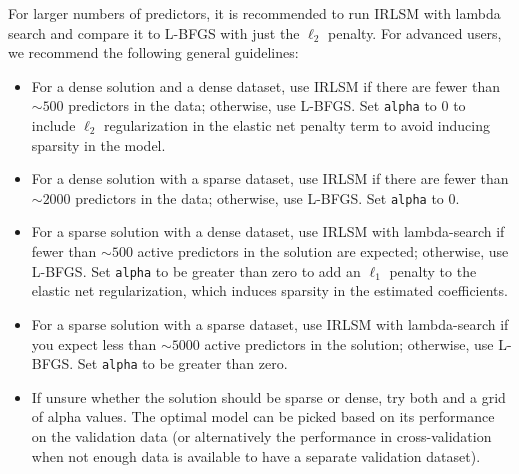 For larger numbers of predictors, it is recommended to run IRLSM with lambda search and compare it to L-BFGS with just the $\ell_2$ penalty. For advanced users, we recommend the following general guidelines:
\begin{itemize}
\item For a dense solution and a dense dataset, use IRLSM if there are fewer than $\sim 500$ predictors in the data; otherwise, use L-BFGS. Set \texttt{alpha} to 0 to include $\ell_2$ regularization in the elastic net penalty term to avoid inducing sparsity in the model.
\item For a dense solution with a sparse dataset, use IRLSM if there are fewer than $\sim 2000$ predictors in the data; otherwise, use L-BFGS. Set \texttt{alpha} to 0.
\item For a sparse solution with a dense dataset, use IRLSM with lambda-search if fewer than $\sim 500$ active predictors in the solution are expected; otherwise, use L-BFGS. Set \texttt{alpha} to be greater than zero to add an $\ell_1$ penalty to the elastic net regularization, which induces sparsity in the estimated coefficients. 
\item For a sparse solution with a sparse dataset, use IRLSM with lambda-search if you expect less than $\sim 5000$ active predictors in the solution; otherwise, use L-BFGS. Set \texttt{alpha} to be greater than zero. 
\item If unsure whether the solution should be sparse or dense, try both and a grid of alpha values. The optimal model can be picked based on its performance on the validation data (or alternatively the performance in cross-validation when not enough data is available to have a separate validation dataset).      
\end{itemize}


